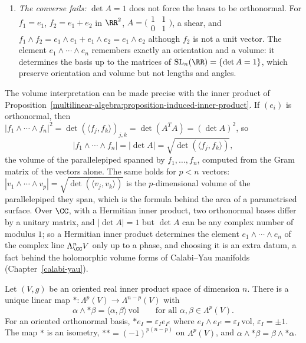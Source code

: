 \begin{remark}
\begin{enumerate}
\item \emph{The converse fails:} $\det A = 1$ does not force the bases to be orthonormal. For $f_1 = e_1$, $f_2 = e_1 + e_2$ in $\RR^2$, $A = \bigl(\begin{smallmatrix} 1 & 1\\ 0 & 1\end{smallmatrix}\bigr)$, a shear, and
$f_1 \wedge f_2 = e_1 \wedge e_1 + e_1 \wedge e_2 = e_1 \wedge e_2$ although $f_2$ is not a unit vector. The element $e_1 \wedge \cdots \wedge e_n$ remembers exactly an orientation and a volume: it determines the
basis up to the matrices of $\mathrm{SL}_n(\RR) = \{\det A = 1\}$, which preserve orientation and volume but not lengths and angles.
\end{enumerate}
The volume interpretation can be made precise with the inner product of Proposition~\ref{multilinear-algebra:proposition-induced-inner-product}. If $(e_i)$ is orthonormal, then
$|f_1 \wedge \cdots \wedge f_n|^2 = \det(\langle f_j, f_k\rangle)_{j,k} = \det(A^TA) = (\det A)^2$, so
\[
|f_1 \wedge \cdots \wedge f_n| = |\det A| = \sqrt{\det(\langle f_j, f_k\rangle)} ,
\]
the volume of the parallelepiped spanned by $f_1, \ldots, f_n$, computed from the Gram matrix of the vectors alone. The same holds for $p < n$ vectors: $|v_1 \wedge \cdots \wedge v_p| = \sqrt{\det(\langle v_j, v_k\rangle)}$ is the
$p$-dimensional volume of the parallelepiped they span, which is the formula behind the area of a parametrised surface. Over $\CC$, with a Hermitian inner product, two orthonormal bases differ by a unitary
matrix, and $|\det A| = 1$ but $\det A$ can be any complex number of modulus $1$; so a Hermitian inner product determines the element $e_1 \wedge \cdots \wedge e_n$ of the complex line $\Lambda^n_\CC V$ only up to a phase, and
choosing it is an extra datum, a fact behind
the holomorphic volume forms of Calabi--Yau manifolds (Chapter~\ref{calabi-yau}).
\end{remark}

\begin{theorem}\label{multilinear-algebra:theorem-hodge-star}
Let $(V, g)$ be an oriented real inner product space of dimension $n$. There is a unique linear map
$* \colon \Lambda^p(V) \to \Lambda^{n-p}(V)$ with
\[
\alpha \wedge *\beta = \langle \alpha, \beta \rangle\, \mathrm{vol} \qquad \text{for all } \alpha, \beta \in \Lambda^p(V).
\]
For an oriented orthonormal basis, $*e_I = \varepsilon_I e_{I^c}$ where $e_I \wedge e_{I^c} = \varepsilon_I\,\mathrm{vol}$,
$\varepsilon_I = \pm 1$. The map $*$ is an isometry, $** = (-1)^{p(n-p)}$ on $\Lambda^p(V)$, and
$\alpha \wedge *\beta = \beta \wedge *\alpha$.
\end{theorem}

